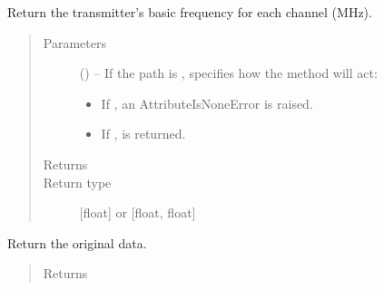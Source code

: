 \documentclass[letterpaper,10pt,english]{sphinxmanual}
\begin{document}
\begin{fulllineitems}
\begin{fulllineitems}
\end{fulllineitems}


\begin{fulllineitems}
\label{\detokenize{references/core:nmrespy.core.Estimator.get_bf}}
\sphinxAtStartPar
Return the transmitter’s basic frequency for each channel (MHz).
\begin{quote}\begin{description}
\item[{Parameters}] \leavevmode
\sphinxAtStartPar
{} (\sphinxstyleliteralemphasis{\sphinxupquote{, }}) – 
\sphinxAtStartPar
If the path is ,  specifies how the method will act:
\begin{itemize}
\item {} 
\sphinxAtStartPar
If , an AttributeIsNoneError is raised.

\item {} 
\sphinxAtStartPar
If ,  is returned.

\end{itemize}


\item[{Returns}] \leavevmode
\sphinxAtStartPar
{}

\item[{Return type}] \leavevmode
\sphinxAtStartPar
{[}float{]} or {[}float, float{]}

\end{description}\end{quote}

\end{fulllineitems}


\begin{fulllineitems}
\label{\detokenize{references/core:nmrespy.core.Estimator.get_data}}
\sphinxAtStartPar
Return the original data.
\begin{quote}\begin{description}
\item[{Returns}] \leavevmode
\sphinxAtStartPar
{}


\end{description}
\end{quote}
\end{fulllineitems}
\end{fulllineitems}
\end{document}
